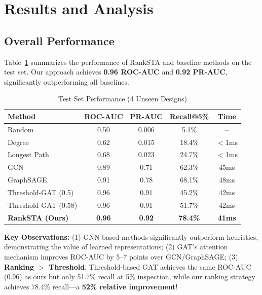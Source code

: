 \section{Results and Analysis}
\label{sec:results}

\subsection{Overall Performance}

Table~\ref{tab:results} summarizes the performance of RankSTA and baseline methods on the test set. Our approach achieves \textbf{0.96 ROC-AUC} and \textbf{0.92 PR-AUC}, significantly outperforming all baselines.

\begin{table}[t]
\centering
\caption{Test Set Performance (4 Unseen Designs)}
\label{tab:results}
\begin{tabular}{@{}lcccc@{}}
\toprule
\textbf{Method} & \textbf{ROC-AUC} & \textbf{PR-AUC} & \textbf{Recall@5\%} & \textbf{Time} \\
\midrule
Random & 0.50 & 0.006 & 5.1\% & -- \\
Degree & 0.62 & 0.015 & 18.4\% & $<$1ms \\
Longest Path & 0.68 & 0.023 & 24.7\% & $<$1ms \\
GCN & 0.89 & 0.71 & 62.3\% & 45ms \\
GraphSAGE & 0.91 & 0.78 & 68.1\% & 48ms \\
Threshold-GAT (0.5) & 0.96 & 0.91 & 45.2\% & 42ms \\
Threshold-GAT (0.58) & 0.96 & 0.91 & 51.7\% & 42ms \\
\midrule
\textbf{RankSTA (Ours)} & \textbf{0.96} & \textbf{0.92} & \textbf{78.4\%} & \textbf{41ms} \\
\bottomrule
\end{tabular}
\end{table}

\textbf{Key Observations:}
(1) GNN-based methods significantly outperform heuristics, demonstrating the value of learned representations;
(2) GAT's attention mechanism improves ROC-AUC by 5--7 points over GCN/GraphSAGE;
(3) \textbf{Ranking $>$ Threshold}: Threshold-based GAT achieves the same ROC-AUC (0.96) as ours but only 51.7\% recall at 5\% inspection, while our ranking strategy achieves 78.4\% recall---a \textbf{52\% relative improvement}!

